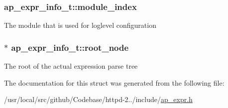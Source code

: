 \subsubsection[{\texorpdfstring{module\+\_\+index}{module_index}}]{ ap\+\_\+expr\+\_\+info\+\_\+t\+::module\+\_\+index}\hypertarget{structap__expr__info__t_a89b1c21768ddb41dc38295388e82410a}{}\label{structap__expr__info__t_a89b1c21768ddb41dc38295388e82410a}
The module that is used for loglevel configuration 
\subsubsection[{\texorpdfstring{root\+\_\+node}{root_node}}]{$\ast$ ap\+\_\+expr\+\_\+info\+\_\+t\+::root\+\_\+node}\hypertarget{structap__expr__info__t_ab065d67efef6635b3e55ace63c1983ef}{}\label{structap__expr__info__t_ab065d67efef6635b3e55ace63c1983ef}
The root of the actual expression parse tree 

The documentation for this struct was generated from the following file\+:\begin{DoxyCompactItemize}
\item 
/usr/local/src/github/\+Codebase/httpd-\/2../include/\hyperlink{ap__expr_8h}{ap\+\_\+expr.\+h}\end{DoxyCompactItemize}
